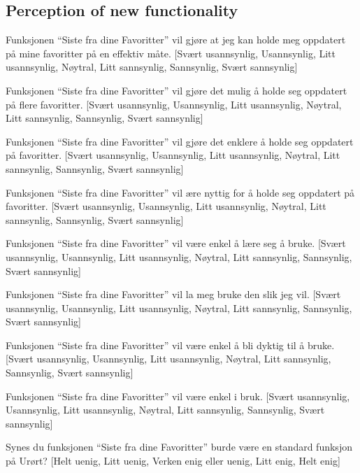\subsection{Perception of new functionality}

\begin{enum}
  \item Funksjonen ``Siste fra dine Favoritter'' vil gjøre at jeg kan holde
    meg oppdatert på mine favoritter på en effektiv måte.
    [Svært usannsynlig, Usannsynlig, Litt usannsynlig, Nøytral,
    Litt sannsynlig,  Sannsynlig, Svært sannsynlig]
  \item Funksjonen ``Siste fra dine Favoritter'' vil gjøre det mulig å holde
    seg oppdatert på flere favoritter.
    [Svært usannsynlig, Usannsynlig, Litt usannsynlig, Nøytral,
    Litt sannsynlig,  Sannsynlig, Svært sannsynlig]
  \item Funksjonen ``Siste fra dine Favoritter'' vil gjøre det enklere å holde
    seg oppdatert på favoritter.
    [Svært usannsynlig, Usannsynlig, Litt usannsynlig, Nøytral,
    Litt sannsynlig,  Sannsynlig, Svært sannsynlig]
  \item Funksjonen ``Siste fra dine Favoritter'' vil ære nyttig for å holde
    seg oppdatert på favoritter.
    [Svært usannsynlig, Usannsynlig, Litt usannsynlig, Nøytral,
    Litt sannsynlig,  Sannsynlig, Svært sannsynlig]
  \item Funksjonen ``Siste fra dine Favoritter'' vil være enkel å lære seg å
    bruke.
    [Svært usannsynlig, Usannsynlig, Litt usannsynlig, Nøytral,
    Litt sannsynlig,  Sannsynlig, Svært sannsynlig]
  \item Funksjonen ``Siste fra dine Favoritter'' vil la meg bruke den slik jeg
    vil.
    [Svært usannsynlig, Usannsynlig, Litt usannsynlig, Nøytral,
    Litt sannsynlig,  Sannsynlig, Svært sannsynlig]
  \item Funksjonen ``Siste fra dine Favoritter'' vil være enkel å bli dyktig
    til å bruke.
    [Svært usannsynlig, Usannsynlig, Litt usannsynlig, Nøytral,
    Litt sannsynlig,  Sannsynlig, Svært sannsynlig]
  \item Funksjonen ``Siste fra dine Favoritter'' vil være enkel i bruk.
    [Svært usannsynlig, Usannsynlig, Litt usannsynlig, Nøytral,
    Litt sannsynlig,  Sannsynlig, Svært sannsynlig]
  \item Synes du funksjonen ``Siste fra dine Favoritter'' burde være en
    standard funksjon på Urørt?
    [Helt uenig, Litt uenig, Verken enig eller uenig, Litt enig, Helt enig]
\end{enum}

